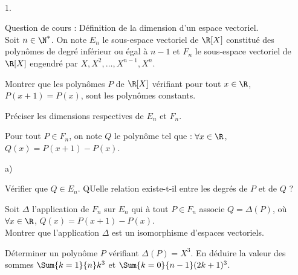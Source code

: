 \documentclass[11pt]{article}%
\begin{document}
\begin{exerciceAP}~
  \begin{noliste}{1.}
    \setlength{\itemsep}{2mm}
  \item Question de cours : Définition de la dimension d'un espace
    vectoriel.\\
    Soit $n\in\N^*$. On note $E_n$ le sous-espace vectoriel de $\R[X]$
    constitué des polynômes de degré inférieur ou égal à $n-1$ et
    $F_n$ le sous-espace vectoriel de $\R[X]$ engendré par $X,X^2,
    \hdots, X^{n-1}, X^n$.

  \item Montrer que les polynômes $P$ de $\R[X]$ vérifiant pour tout
    $x\in\R$, $P(x+1) = P(x)$, sont les polynômes constants.
  \item Préciser les dimensions respectives de $E_n$ et $F_n$.
  \item Pour tout $P\in F_n$, on note $Q$ le polynôme tel que :
    $\forall x\in\R$, $Q(x) = P(x+1) - P(x)$.
    \begin{noliste}{a)}
    \setlength{\itemsep}{2mm}
    \item Vérifier que $Q\in E_n$. QUelle relation existe-t-il entre
      les degrés de $P$ et de $Q$ ?
    \item Soit $\Delta$ l'application de $F_n$ sur $E_n$ qui à tout
      $P\in F_n$ associe $Q=\Delta (P)$, où $\forall x\in\R$,
      $Q(x) = P(x+1)- P(x)$.\\
      Montrer que l'application $\Delta$ est un isomorphisme d'espaces
      vectoriels.
    \item Déterminer un polynôme $P$ vérifiant $\Delta (P)=X^3$. En
      déduire la valeur des sommes $\Sum{k=1}{n} k^3$ et
      $\Sum{k=0}{n-1} (2k+1)^3$.
    \end{noliste}
  \end{noliste}
\end{exerciceAP}

\end{document}

